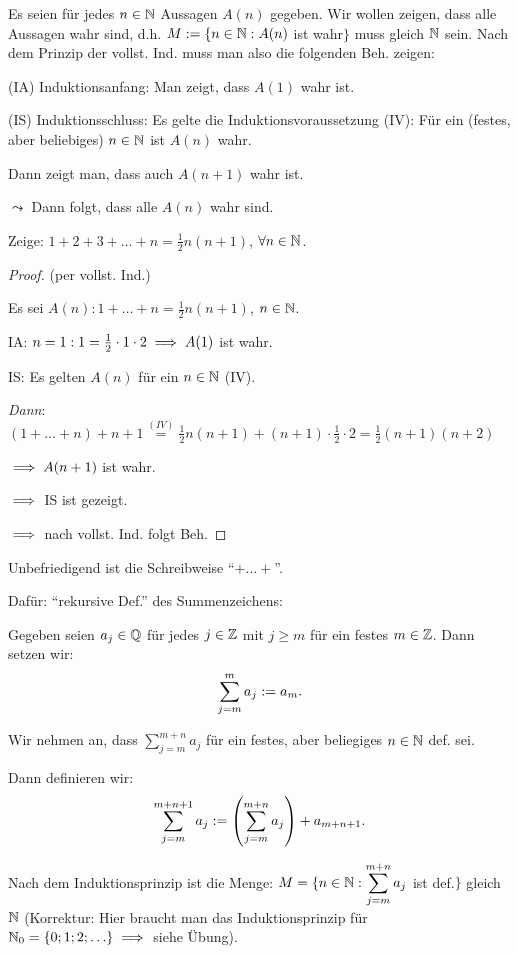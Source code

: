 \documentclass[12pt]{scrreprt}
\begin{document}
Es seien für jedes $n\in\mathbb{N}$ Aussagen $A(n)$ gegeben. Wir wollen zeigen, dass alle Aussagen wahr sind, d.h. $M := \{n\in\mathbb{N}: A(n)$ ist wahr$\}$ muss gleich $\mathbb{N}$ sein. Nach dem Prinzip der vollst. Ind. muss man also die folgenden Beh. zeigen:

(IA) Induktionsanfang: Man zeigt, dass $A(1)$ wahr ist.

(IS) Induktionsschluss: Es gelte die Induktionsvoraussetzung (IV): Für ein (festes, aber beliebiges) $n\in\mathbb{N}$ ist $A(n)$ wahr.

Dann zeigt man, dass auch $A(n+1)$ wahr ist.

$\leadsto$ Dann folgt, dass alle $A(n)$ wahr sind.

\begin{bsp}
Zeige: $1 + 2 + 3 + \ldots + n = \frac{1}{2}n(n+1)$, $\forall n\in\mathbb{N}$.
\begin{proof} (per vollst. Ind.)

Es sei $A(n): 1 + \ldots + n = \frac{1}{2}n(n+1)$, $n\in\mathbb{N}$.

IA: $n = 1: 1 = \frac{1}{2}\cdot 1 \cdot 2 \implies A(1)$ ist wahr.

IS: Es gelten $A(n)$ für ein $n\in\mathbb{N}$ (IV).

\textit{Dann}: $(1+ \ldots + n) + n+1 \stackrel{(IV)}{=} \frac{1}{2}n(n+1) + (n+1)\cdot\frac{1}{2}\cdot 2 = \frac{1}{2}(n+1)(n+2)$

$\implies A(n+1)$ ist wahr.

$\implies$ IS ist gezeigt.

$\implies$ nach vollst. Ind. folgt Beh.
\end{proof}

Unbefriedigend ist die Schreibweise "`$+\ldots +$"'.

Dafür: "`rekursive Def."' des Summenzeichens:

Gegeben seien $a_j\in\mathbb{Q}$ für jedes $j\in\mathbb{Z}$ mit $j \geq m$ für ein festes $m\in\mathbb{Z}$. Dann setzen wir:
\[\sum_{j=m}^m a_j := a_m.\]

Wir nehmen an, dass $\displaystyle \sum_{j=m}^{m+n} a_j$ für ein festes, aber beliegiges $n\in\mathbb{N}$ def. sei.

Dann definieren wir:
\[\sum_{j=m}^{m+n+1} a_j := \left( \sum_{j=m}^{m+n} a_j\right) + a_{m+n+1}.\]

Nach dem Induktionsprinzip ist die Menge: $\displaystyle M = \{n\in\mathbb{N}: \sum_{j=m}^{m+n} a_j$ ist def.$\}$ gleich $\mathbb{N}$ (Korrektur: Hier braucht man das Induktionsprinzip für $\mathbb{N}_0 = \{0; 1; 2; \ldots\} \implies$ siehe Übung).


\end{bsp}
\end{document}
